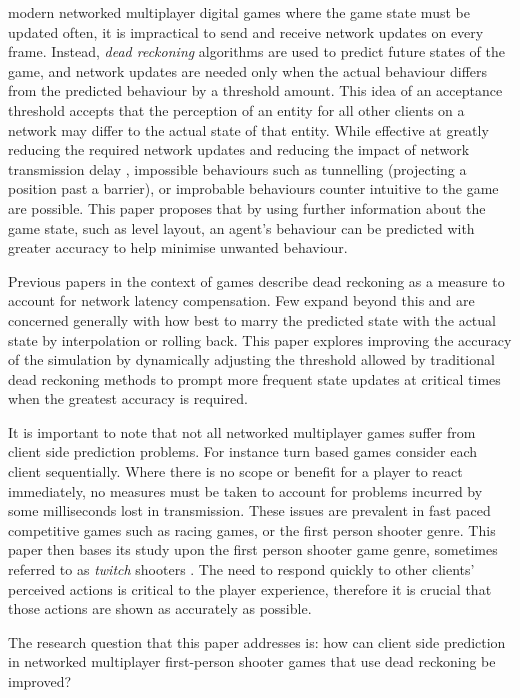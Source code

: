 \documentclass[journal]{IEEEtran}
\begin{document}
 modern networked multiplayer digital games where the game state must be updated often, it is impractical to send and receive network updates on every frame. Instead, \textit{dead reckoning} algorithms are used to predict future states of the game, and network updates are needed only when the actual behaviour differs from the predicted behaviour by a threshold amount. This idea of an acceptance threshold accepts that the perception of an entity for all other clients on a network may differ to the actual state of that entity. While effective at greatly reducing the required network updates and reducing the impact of network transmission delay \cite{pantel2002suitability}, impossible behaviours such as tunnelling (projecting a position past a barrier), or improbable behaviours counter intuitive to the game are possible. This paper proposes that by using further information about the game state, such as level layout, an agent's behaviour can be predicted with greater accuracy to help minimise unwanted behaviour.

Previous papers in the context of games describe dead reckoning as a measure to account for network latency compensation. Few expand beyond this and are concerned generally with how best to marry the predicted state with the actual state by interpolation or rolling back. This paper explores improving the accuracy of the simulation by dynamically adjusting the threshold allowed by traditional dead reckoning methods to prompt more frequent state updates at critical times when the greatest accuracy is required.

It is important to note that not all networked multiplayer games suffer from client side prediction problems. For instance turn based games consider each client sequentially. Where there is no scope or benefit for a player to react immediately, no measures must be taken to account for problems incurred by some milliseconds lost in transmission. These issues are prevalent in fast paced competitive games such as racing games, or the first person shooter genre. This paper then bases its study upon the first person shooter game genre, sometimes referred to as \textit{twitch} shooters \cite{lee2015outatime}. The need to respond quickly to other clients' perceived actions is critical to the player experience, therefore it is crucial that those actions are shown as accurately as possible.

The research question that this paper addresses is: how can client side prediction in networked multiplayer first-person shooter games that use dead reckoning be improved?
\end{document}
